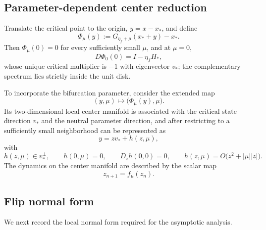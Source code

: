 \subsection{Parameter-dependent center reduction}
\label{subsec:parameter-center-reduction}

Translate the critical point to the origin, $y=x-x_*$, and define
\begin{equation}
\Phi_\mu(y)
:=
G_{\eta_f+\mu}(x_*+y)-x_*.
\label{eq:Phi-mu}
\end{equation}
Then $\Phi_\mu(0)=0$ for every sufficiently small $\mu$, and at
$\mu=0$,
\begin{equation}
D\Phi_0(0)
=
I-\eta_fH_*,
\label{eq:Phi-linearization}
\end{equation}
whose unique critical multiplier is $-1$ with eigenvector $v_*$; the
complementary spectrum lies strictly inside the unit disk.

To incorporate the bifurcation parameter, consider the extended map
\begin{equation}
(y,\mu)
\longmapsto
\bigl(\Phi_\mu(y),\mu\bigr).
\label{eq:extended-map}
\end{equation}
Its two-dimensional local center manifold is associated with the
critical state direction $v_*$ and the neutral parameter direction,
and after restricting to a sufficiently small neighborhood can be
represented as
\begin{equation}
y
=
zv_*+h(z,\mu),
\label{eq:center-parametrization}
\end{equation}
with
\begin{equation}
h(z,\mu)\in v_*^\perp,
\qquad
h(0,\mu)=0,
\qquad
D_zh(0,0)=0,
\qquad
h(z,\mu)
=
O\bigl(z^2+|\mu||z|\bigr).
\label{eq:center-h-properties}
\end{equation}
The dynamics on the center manifold are described by the scalar map
\begin{equation}
z_{n+1}
=
f_\mu(z_n).
\label{eq:reduced-map}
\end{equation}

\subsection{Flip normal form}
\label{subsec:flip-normal-form}

We next record the local normal form required for the asymptotic
analysis.

